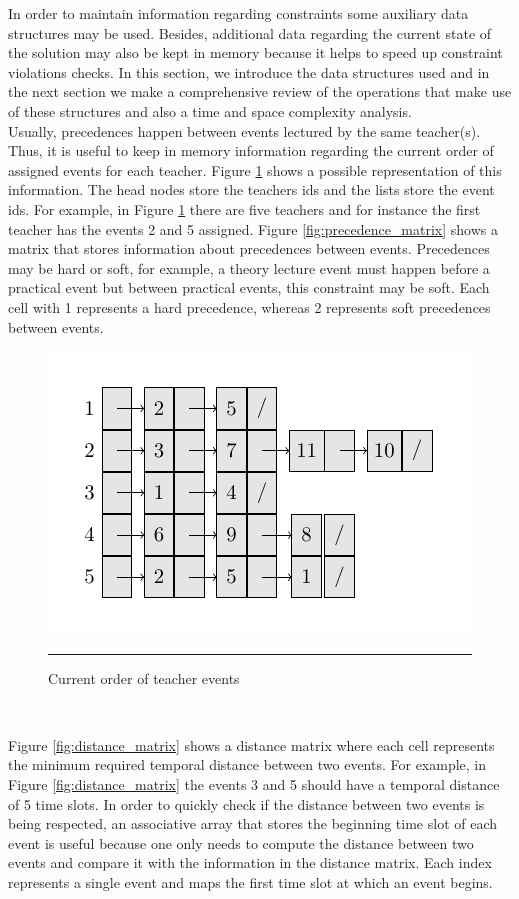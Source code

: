 In order to maintain information regarding constraints some auxiliary data structures may be used. Besides, additional data regarding the current state of the solution may also be  kept in memory because it helps to speed up constraint violations checks. In this section, we introduce the data structures used and in the next section we make a comprehensive review of the operations that make use of these structures and also a time and space complexity analysis. \\
Usually, precedences happen between events lectured by the same teacher(s). Thus, it is useful to keep in memory information regarding the current order of assigned events for each teacher. Figure \ref{fig:teacher_events_timeslots} shows a possible representation of this information. The head nodes store the teachers ids and the lists store the event ids. For example, in Figure \ref{fig:teacher_events_timeslots} there are five teachers and for instance the first teacher has the events 2 and 5 assigned.
Figure \ref{fig:precedence_matrix} shows a matrix that stores information about precedences between events. Precedences may be hard or soft, for example, a theory lecture event must happen before a practical event but between practical events, this constraint may be soft. Each  cell with 1 represents a hard precedence, whereas 2 represents soft precedences between events. 

\begin{figure}[th]
	\centering
	\includegraphics[scale=0.95]{./Figures/tkiz/teacher_schedule.pdf}
	\rule{35em}{0.5pt}
	\caption[Current order of teacher events]{Current order of teacher events} 
	\label{fig:teacher_events_timeslots}
\end{figure}
\

 Figure \ref{fig:distance_matrix} shows a distance matrix where each cell represents the minimum required temporal distance between two events. For example, in Figure \ref{fig:distance_matrix} the events 3 and 5 should have a temporal distance of 5 time slots. In order to quickly check if the distance between two events is being respected, an associative array that stores the beginning time slot of each event is useful because one only needs to compute the distance between two events and compare it with the information in the distance matrix. Each index represents a single event and maps the first time slot at which an event begins.\\

